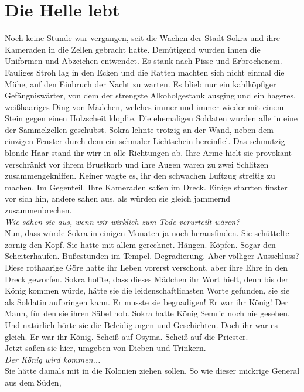 \chapter{Die Helle lebt}

Noch keine Stunde war vergangen, seit die Wachen der Stadt Sokra und ihre Kameraden in die Zellen 
gebracht hatte. Demütigend wurden ihnen die Uniformen und Abzeichen entwendet. Es stank nach Pisse 
und Erbrochenem. Fauliges Stroh lag in den Ecken und die Ratten machten sich nicht einmal die Mühe, 
auf den Einbruch der Nacht zu warten. Es blieb nur ein kahlköpfiger Gefängniswärter, von dem der 
strengste Alkoholgestank ausging und ein hageres, weißhaariges Ding von Mädchen, welches immer und 
immer wieder mit einem Stein gegen einen Holzscheit klopfte. Die ehemaligen Soldaten wurden alle in 
eine der Sammelzellen geschubst. Sokra lehnte trotzig an der Wand, neben dem einzigen Fenster durch 
dem ein schmaler Lichtschein hereinfiel. Das schmutzig blonde Haar stand ihr wirr in alle Richtungen 
ab. Ihre Arme hielt sie provokant verschränkt vor ihrem Brustkorb und ihre Augen waren zu zwei 
Schlitzen zusammengekniffen. Keiner wagte es, ihr den schwachen Luftzug streitig zu machen. Im 
Gegenteil. Ihre Kameraden saßen im Dreck. Einige starrten finster vor sich hin, andere sahen aus, 
als würden sie gleich jammernd zusammenbrechen.\\
\textit{Wie sähen sie aus, wenn wir wirklich zum Tode verurteilt wären?}\\
Nun, dass würde Sokra in einigen Monaten ja noch herausfinden. Sie schüttelte zornig den Kopf. Sie 
hatte mit allem gerechnet. Hängen. Köpfen. Sogar den Scheiterhaufen. Bußestunden im Tempel. 
Degradierung. Aber völliger Ausschluss? Diese rothaarige Göre hatte ihr Leben vorerst verschont, 
aber ihre Ehre in den Dreck geworfen. Sokra hoffte, dass dieses Mädchen ihr Wort hielt, denn bis 
der König kommen würde, hätte sie die leidenschaftlichsten Worte gefunden, sie sie als Soldatin 
aufbringen kann. Er musste sie begnadigen! Er war ihr König! Der Mann, für den sie ihren Säbel 
hob. Sokra hatte König Semric noch nie gesehen. Und natürlich hörte sie die Beleidigungen und 
Geschichten. Doch ihr war es gleich. Er war ihr König. Scheiß auf Osyma. Scheiß auf die Priester.\\
Jetzt saßen sie hier, umgeben von Dieben und Trinkern.\\
\textit{Der König wird kommen...}\\
Sie hätte damals mit in die Kolonien ziehen sollen. So wie dieser mickrige General aus dem Süden, 
